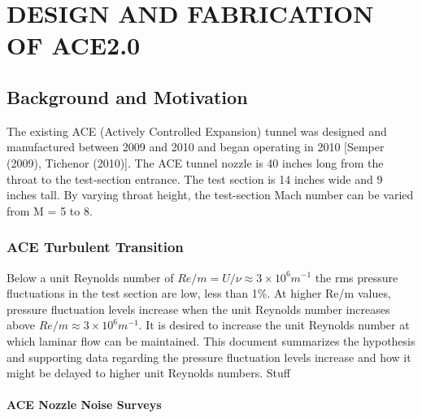 %
%  
%



\chapter{DESIGN AND FABRICATION OF ACE2.0}

\section{Background and Motivation}

The existing ACE (Actively Controlled Expansion) tunnel was designed and manufactured between 2009 and 2010 and began operating in 2010 [Semper (2009), Tichenor (2010)]. The ACE tunnel nozzle is 40 inches long from the throat to the test-section entrance. The test section is 14 inches wide and 9 inches tall. By varying throat height, the test-section Mach number can be varied from M = 5 to 8.

\subsection{ACE Turbulent Transition}

Below a unit Reynolds number of $Re/m = U/\nu \approx 3 \times 10^6 m^{-1}$ the rms pressure fluctuations in the test section are low, less than 1\%. At higher Re/m values, pressure fluctuation levels increase when the unit Reynolds number increases above $Re/m \approx 3 \times 10^6 m^{-1}$. It is desired to increase the unit Reynolds number at which laminar flow can be maintained. This document summarizes the hypothesis and supporting data regarding the pressure fluctuation levels increase and how it might be delayed to higher unit Reynolds numbers.
Stuff

\subsubsection{ACE Nozzle Noise Surveys}

